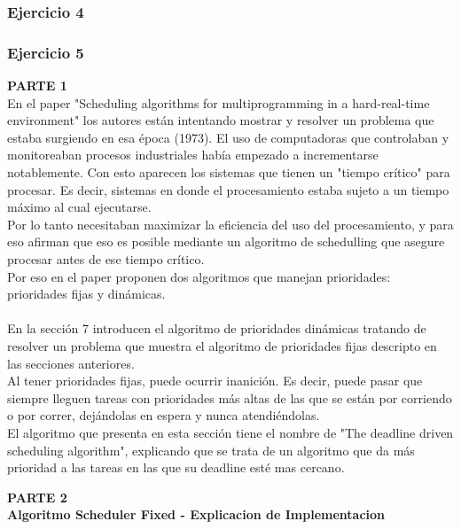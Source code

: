 \subsubsection[Resolución Ejercicio 4]{Ejercicio 4}

\subsubsection[Resolución Ejercicio 5]{Ejercicio 5}
\textbf{PARTE 1}\\
En el paper "Scheduling algorithms for multiprogramming
in a hard-real-time environment" los autores están intentando mostrar y resolver un problema que estaba surgiendo en esa época (1973). El uso de computadoras que controlaban y monitoreaban procesos industriales había empezado a incrementarse notablemente. Con esto aparecen los sistemas que tienen un "tiempo crítico" para procesar. Es decir, sistemas en donde el procesamiento estaba sujeto a un tiempo máximo al cual ejecutarse.\\
Por lo tanto necesitaban maximizar la eficiencia del uso del procesamiento, y para eso afirman que eso es posible mediante un algoritmo de schedulling que asegure procesar antes de ese tiempo crítico.\\
Por eso en el paper proponen dos algoritmos que manejan prioridades: prioridades fijas y dinámicas.\\

\\
En la sección 7 introducen el algoritmo de prioridades dinámicas tratando de resolver un problema que muestra el algoritmo de prioridades fijas descripto en las secciones anteriores.\\
Al tener prioridades fijas, puede ocurrir inanición. Es decir, puede pasar que siempre lleguen tareas con prioridades más altas de las que se están por corriendo o por correr, dejándolas en espera y nunca atendiéndolas.\\
El algoritmo que presenta en esta sección tiene el nombre de "The deadline driven scheduling algorithm", explicando que se trata de un algoritmo que da más prioridad a las tareas en las que su deadline esté mas cercano. 





\textbf{PARTE 2}\\

\textbf{Algoritmo Scheduler Fixed - Explicacion de Implementacion}\\

